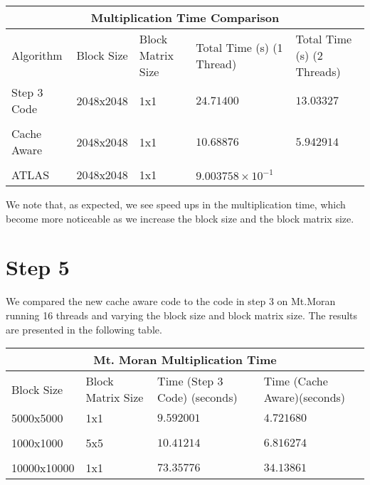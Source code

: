 \documentclass[12pt]{article}
\newcommand{\0}{\mathbf{0}}
\begin{document}
	
	
	\begin{center}
		
		\begin{tabular}{ |p{2cm}| |p{2cm}| |p{2cm}||p{3cm}||p{3cm}|}
			\hline
			\multicolumn{5}{|c|}{Multiplication Time Comparison } \\
			\hline
			Algorithm& Block Size &Block Matrix Size & Total Time (s) (1 Thread)& Total Time (s) (2 Threads)\\
			\hline
			Step 3 Code & 2048x2048 &  1x1 & $24.71400$  & $13.03327$    \\
			&  &  & & \\
			
			Cache Aware & 2048x2048& 1x1 &  $10.68876$ & $5.942914$   \\ 
			
			& & & & \\
			
			ATLAS & 2048x2048 & 1x1 & $9.003758\times10^{-1}$&  \\
			
			
			\hline
		\end{tabular}
		
	\end{center}
	
	
	We note that, as expected, we see speed ups in the multiplication time, which become more noticeable as we increase the block size and the block matrix size.
	
	\section{Step 5}
	
	We compared the new cache aware code to the code in step 3 on Mt.Moran running 16 threads and varying the block size and block matrix size. The results are presented in the following table. \\
	
	\begin{center}
		
		\begin{tabular}{ |p{2cm}| |p{2cm}||p{3cm}||p{3cm}|}
			\hline
			\multicolumn{4}{|c|}{Mt. Moran Multiplication Time} \\
			\hline
			Block Size &Block Matrix Size & Time (Step 3 Code) (seconds) & Time (Cache Aware)(seconds) \\
			\hline
			5000x5000 &  1x1& $9.592001$& $4.721680$  \\
			
			&  &  &\\
			
			1000x1000& 5x5 & $10.41214$& $6.816274$  \\ 
			
			& & & \\
			
			10000x10000 & 1x1 & $73.35776$& $34.13861$  \\
			
			
			
			
			\hline
		\end{tabular}
		
	\end{center}
	
\end{document}
